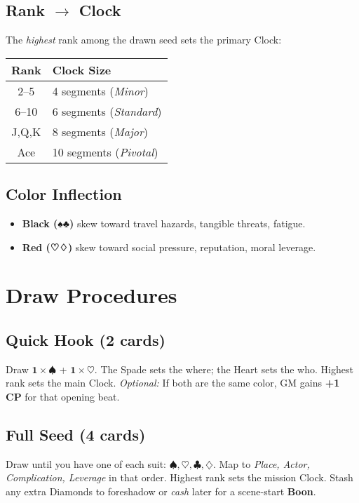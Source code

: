 \begin{multicols}{2}
\subsection*{Rank \(\rightarrow\) Clock}
The \emph{highest} rank among the drawn seed sets the primary Clock:
\begin{center}
\begin{tabular}{cl}
\toprule
\textbf{Rank} & \textbf{Clock Size} \\
\midrule
2–5 & 4 segments (\emph{Minor}) \\
6–10 & 6 segments (\emph{Standard}) \\
J,Q,K & 8 segments (\emph{Major}) \\
Ace & 10 segments (\emph{Pivotal}) \\
\bottomrule
\end{tabular}
\end{center}

\subsection*{Color Inflection}
\begin{itemize}
  \item \textbf{Black (♠♣)} skew toward travel hazards, tangible threats, fatigue.
  \item \textbf{Red (♡♢)} skew toward social pressure, reputation, moral leverage.
\end{itemize}

\section{Draw Procedures}

\subsection*{Quick Hook (2 cards)}
Draw \(\mathbf{1\times♠}\) + \(\mathbf{1\times♡}\).\; The Spade sets the where; the Heart sets the who. Highest rank sets the main Clock. \emph{Optional:} If both are the same color, GM gains \textbf{+1 CP} for that opening beat. 

\subsection*{Full Seed (4 cards)}
Draw until you have one of each suit: \(\spadesuit,\heartsuit,\clubsuit,\diamondsuit\).\; Map to \emph{Place, Actor, Complication, Leverage} in that order. Highest rank sets the mission Clock. Stash any extra Diamonds to foreshadow or \emph{cash} later for a scene-start \textbf{Boon}. 


\end{multicols}
